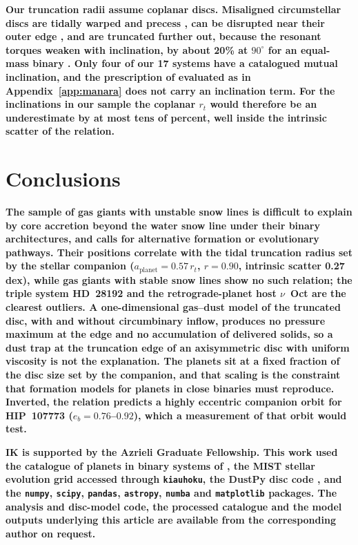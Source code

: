 \documentclass{aa}
\newcommand{\rev}[1]{{\color{red}\textbf{#1}}}
\begin{document}
\rev{Our truncation radii assume coplanar discs. Misaligned
circumstellar discs are tidally warped and precess \citep{Larwood1996,
Fragner2010}, can be disrupted near their outer edge \citep{Dogan2015},
and are truncated further out, because the resonant torques weaken with
inclination, by about 20\% at $90^\circ$ for an equal-mass binary
\citep{Miranda2015, Lubow2015}. Only four of our 17 systems have a
catalogued mutual inclination, and the prescription of
\citet{Manara2019A&A...628A..95M} evaluated as in
Appendix~\ref{app:manara} does not carry an inclination term. For the
inclinations in our sample the coplanar $r_t$ would therefore be an
underestimate by at most tens of percent, well inside the intrinsic
scatter of the relation.}

\section{Conclusions}
\label{sec:conclusions}

\rev{The sample of gas giants with unstable snow lines is difficult to
explain by core accretion beyond the water snow line under their binary
architectures, and calls for alternative formation or evolutionary
pathways. Their positions correlate with the tidal
truncation radius set by the stellar companion
($a_\mathrm{planet} = 0.57\,r_t$, $r = 0.90$, intrinsic scatter
0.27\,dex), while gas giants with stable snow lines show no such
relation; the triple system HD~28192 and the retrograde-planet host
$\nu$~Oct are the clearest outliers. A one-dimensional gas--dust model
of the truncated disc, with and without circumbinary inflow, produces no
pressure maximum at the edge and no accumulation of delivered solids, so
a dust trap at the truncation edge of an axisymmetric disc with uniform
viscosity is not the explanation. The planets sit
at a fixed fraction of the disc size set by the companion, and that
scaling is the constraint that formation models for planets in close
binaries must reproduce. Inverted, the relation predicts a highly
eccentric companion orbit for HIP~107773 ($e_b = 0.76$--$0.92$), which
a measurement of that orbit would test.}

\begin{acknowledgements}
\rev{IK is supported by the Azrieli Graduate Fellowship. This work used the catalogue of planets in binary systems of
\citet{Thebault2025}, the MIST stellar evolution grid
\citep{Choi2016} accessed through \texttt{kiauhoku}, the DustPy disc
code \citep{Stammler2022}, and the \texttt{numpy}, \texttt{scipy},
\texttt{pandas}, \texttt{astropy}, \texttt{numba} and
\texttt{matplotlib} packages. The analysis and disc-model code, the
processed catalogue and the model outputs underlying this article are
available from the corresponding author on request.}
\end{acknowledgements}
\end{document}
